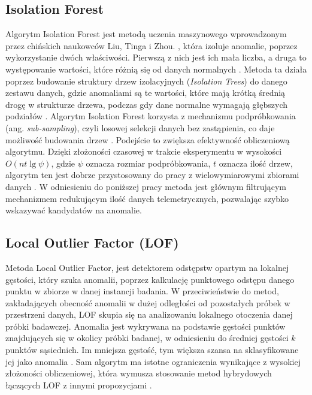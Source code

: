 \documentclass[a4paper,twoside,12pt]{book}
\renewcommand{\log}{\operatorname {lg}}
\begin{document}
	\subsection{Isolation Forest}
	Algorytm Isolation Forest jest metodą uczenia maszynowego wprowadzonym przez chińskich naukowców Liu, Tinga i Zhou\cite{liu2008isolation}.  , która izoluje anomalie, poprzez wykorzystanie dwóch właściwości. Pierwszą z nich jest ich mała liczba, a druga to występowanie wartości, które różnią się od danych normalnych \cite{liu2008isolation}. Metoda ta działa poprzez budowanie struktury drzew izolacyjnych (\textit{Isolation Trees}) do danego zestawu danych, gdzie anomaliami są te wartości, które mają krótką średnią drogę w strukturze drzewa, podczas gdy dane normalne wymagają głębszych podziałów  \cite{liu2008isolation}. Algorytm Isolation Forest korzysta z mechanizmu podpróbkowania (ang. \textit{sub-sampling}), czyli losowej selekcji danych bez zastąpienia, co daje możliwość budowania drzew \cite{liu2008isolation}.  Podejście to zwiększa efektywność obliczeniową algorytmu. Dzięki złożoności czasowej w trakcie eksperymentu w wysokości $O(nt\log \psi)$, gdzie $\psi$ oznacza rozmiar podpróbkowania, $t$ oznacza ilość drzew, algorytm ten jest dobrze przystosowany do pracy z wielowymiarowymi zbiorami danych \cite{liu2008isolation}. W odniesieniu do poniższej pracy metoda jest głównym filtrującym mechanizmem redukującym ilość danych telemetrycznych, pozwalając szybko wskazywać kandydatów na anomalie.
	
	\subsection{Local Outlier Factor (LOF)}
	Metoda Local Outlier Factor, jest detektorem odstępstw opartym na lokalnej gęstości, który szuka anomalii, poprzez kalkulację punktowego odstępu danego punktu w zbiorze w danej instancji badania. W przeciwieństwie do metod, zakładających obecność anomalii w dużej odległości od pozostałych próbek w przestrzeni danych, LOF skupia się na analizowaniu lokalnego otoczenia danej próbki badawczej. Anomalia jest wykrywana na podstawie gęstości punktów znajdujących się w okolicy próbki badanej, w odniesieniu do średniej gęstości $k$ punktów sąsiednich. Im mniejsza gęstość, tym większa szansa na sklasyfikowane jej jako anomalia \cite{cheng2019outlier}. Sam algorytm ma istotne ograniczenia wynikające z wysokiej złożoności obliczeniowej, która wymusza stosowanie metod hybrydowych łączących LOF z innymi propozycjami \cite{cheng2019outlier}.
	
\end{document}
